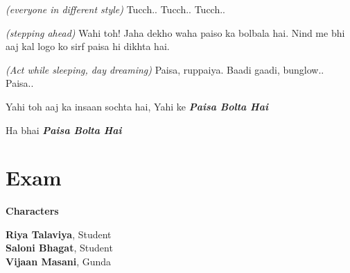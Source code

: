 \documentclass[12pt,a4paper,oneside]{memoir}
\begin{document}
\begin{description}[itemsep=1ex,leftmargin=1cm]
\item[ALL] \textit{(everyone in different style)} Tucch.. Tucch.. Tucch..

\item[KAVITA] \textit{(stepping ahead)} Wahi toh! Jaha dekho waha paiso ka bolbala hai. Nind me bhi aaj kal logo ko sirf paisa hi dikhta hai.

\item[BHARGAV] \textit{(Act while sleeping, day dreaming)} Paisa, ruppaiya. Baadi gaadi, bunglow.. Paisa..

\item[KAVITA] Yahi toh aaj ka insaan sochta hai, Yahi ke \textbf{\textit{Paisa Bolta Hai}}
\item[ALL] Ha bhai \textbf{\textit{Paisa Bolta Hai}}

\end{description}

\chapter*{Exam}

\begin{center}


\textbf{Characters}

\vskip 1cm

\textbf{Riya Talaviya}, Student \\
\textbf{Saloni Bhagat}, Student \\
\textbf{Vijaan Masani}, Gunda \\
\vskip 1cm
\end{center}
\end{document}

